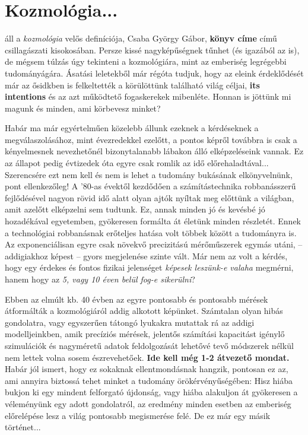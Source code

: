 \section{Kozmológia...}
 áll a \textit{kozmológia} velős definíciója, Csaba György Gábor, \textbf{könyv címe} című csillagászati kisokosában. Persze kissé nagyképűségnek tűnhet (és igazából az is), de mégsem túlzás úgy tekinteni a kozmológiára, mint az emberiség legrégebbi tudományágára. Ásatási leletekből már régóta tudjuk, hogy az eleink érdeklődését már az ősidkben is felkeltették a körülöttünk található világ céljai, \textbf{its intentions} és az azt működtető fogaskerekek mibenléte. Honnan is jöttünk mi magunk és minden, ami körbevesz minket?

Habár ma már egyértelműen közelebb állunk ezeknek a kérdéseknek a megválaszolásához, mint évezredekkel ezelőtt, a pontos képről továbbra is csak a kényelmesnek nevezhetőnél bizonytalanabb lábakon álló elképzeléseink vannak. Ez az állapot pedig évtizedek óta egyre csak romlik az idő előrehaladtával... Szerencsére ezt nem kell és nem is lehet a tudomány bukásának elkönyvelnünk, pont ellenkezőleg! A '80-as évektől kezdődően a számítástechnika robbanásszerű fejlődésével nagyon rövid idő alatt olyan ajtók nyíltak meg előttünk a világban, amit azelőtt elképzelni sem tudtunk. Ez, annak minden jó és kevésbé jó hozadékával egyetemben, gyökeresen formálta át életünk minden részletét. Ennek a technológiai robbanásnak erőteljes hatása volt többek között a tudományra is. Az exponenciálisan egyre csak növekvő precizitású mérőműszerek egymás utáni, -- addigiakhoz képest -- gyors megjelenése szinte  vált. Már nem az volt a kérdés, hogy egy érdekes és fontos fizikai jelenséget \textit{képesek leszünk-e valaha} megmérni, hanem hogy az \textit{5, vagy 10 éven belül fog-e sikerülni}?

Ebben az elmúlt kb. 40 évben az egyre pontosabb és pontosabb mérések átformálták a kozmológiáról addig alkotott képünket. Számtalan olyan hibás gondolatra, vagy egyszerűen tátongó lyukakra mutattak rá az addigi modelljeinkben, amik precíziós mérések, jelentős számítási kapacitást igénylő szimulációk és nagyméretű adatok feldolgozását lehetővé tevő módszerek nélkül nem lettek volna sosem észrevehetőek. \textbf{Ide kell még 1-2 átvezető mondat.} Habár jól ismert, hogy ez sokaknak ellentmondásnak hangzik, pontosan ez az, ami annyira biztossá tehet minket a tudomány örökérvényűségében: Hisz hiába bukjon ki egy mindent felforgató újdonság, vagy hiába alakuljon át gyökeresen a véleményünk egy adott gondolatról, az eredmény minden esetben az emberiség előrelépése lesz a világ pontosabb megismerése felé. De ez már egy másik történet...


